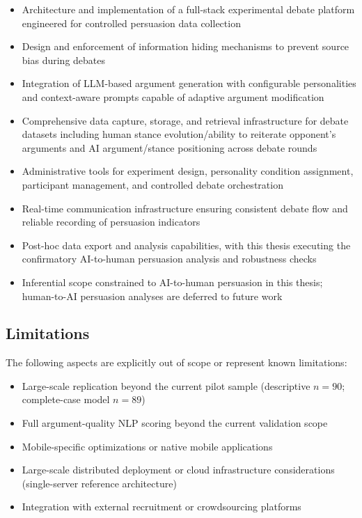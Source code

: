 \begin{itemize}
    \item Architecture and implementation of a full-stack experimental debate platform engineered
    for controlled persuasion data collection
    \item Design and enforcement of information hiding mechanisms to prevent source bias during
    debates
    \item Integration of LLM-based argument generation with configurable personalities and
    context-aware prompts capable of adaptive argument modification
    \item Comprehensive data capture, storage, and retrieval infrastructure for debate datasets including
    human stance evolution/ability to reiterate opponent's arguments and AI argument/stance positioning across debate rounds
    \item Administrative tools for experiment design, personality condition assignment, participant
    management, and controlled debate orchestration
    \item Real-time communication infrastructure ensuring consistent debate flow and reliable recording
    of persuasion indicators
    \item Post-hoc data export and analysis capabilities, with this thesis executing the
    confirmatory AI-to-human persuasion analysis and robustness checks
    \item Inferential scope constrained to AI-to-human persuasion in this thesis;
    human-to-AI persuasion analyses are deferred to future work
\end{itemize}

\subsection{Limitations}

The following aspects are explicitly out of scope or represent known limitations:

\begin{itemize}
    \item Large-scale replication beyond the current pilot sample (descriptive $n=90$; complete-case model $n=89$)
    \item Full argument-quality NLP scoring beyond the current validation scope
    \item Mobile-specific optimizations or native mobile applications
    \item Large-scale distributed deployment or cloud infrastructure considerations
    (single-server reference architecture)
    \item Integration with external recruitment or crowdsourcing platforms
\end{itemize}

